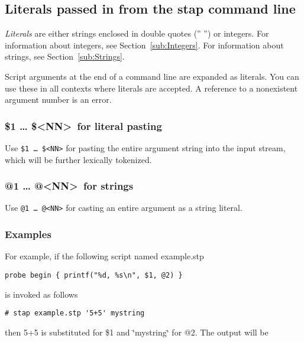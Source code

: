 \documentclass[twoside,english]{article}
\newenvironment{vindent}
{\begin{list}{}{\setlength{\listparindent}{6pt}}
\item[]}
{\end{list}}
\begin{document}
\subsection{Literals passed in from the stap command line\label{sub:Literals-passed-in}}
\emph{Literals} are either strings enclosed in double quotes ('' '') or
integers. For information about integers, see Section~\ref{sub:Integers}.
For information about strings, see Section~\ref{sub:Strings}.

Script arguments at the end of a command line are expanded as literals. You
can use these in all contexts where literals are accepted. A reference to
a nonexistent argument number is an error.


\subsubsection{\$1 \ldots{} \$\textless NN\textgreater\ for literal pasting}
\index{\$}
Use \texttt{\$1 \ldots{} \$<NN>} for pasting the entire argument string 
into the input stream, which will be further lexically tokenized.

\subsubsection{@1 \ldots{} @\textless NN\textgreater\ for strings}

Use \texttt{@1 \ldots{} @<NN>} for casting an entire argument
as a string literal.

\subsubsection{Examples}

For example, if the following script named example.stp

\begin{vindent}
\begin{verbatim}
probe begin { printf("%d, %s\n", $1, @2) }
\end{verbatim}
\end{vindent}
is invoked as follows

\begin{vindent}
\begin{verbatim}
# stap example.stp '5+5' mystring
\end{verbatim}
\end{vindent}
then 5+5 is substituted for \$1 and \char`\"{}mystring\char`\"{} for @2. The
output will be
\end{document}
